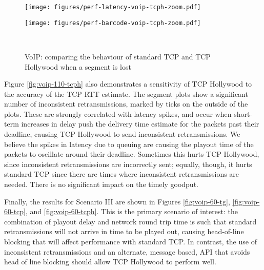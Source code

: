 \begin{figure*}[t!]
{{\begin{minipage}{91mm}
\texttt{[image: figures/perf-latency-voip-tcph-zoom.pdf]}\vspace{1mm}
\end{minipage}
\begin{minipage}{91mm}
\texttt{[image: figures/perf-barcode-voip-tcph-zoom.pdf]}\vspace{1mm}
\end{minipage}
\begin{minipage}{91mm}~\end{minipage}
}}
\caption{VoIP: comparing the behaviour of standard TCP and TCP Hollywood when a segment is lost}
\label{fig:voip-comparison}
\end{figure*}

Figure \ref{fig:voip-110-tcph} also demonstrates a sensitivity of TCP
Hollywood to the accuracy of the TCP RTT estimate. The segment plots
show a significant number of inconsistent retransmissions, marked by
ticks on the outside of the plots. These are strongly correlated with
latency spikes, and occur when short-term increases in delay push the
delivery time estimate for the packets past their deadline, causing
TCP Hollywood to send inconsistent retransmissions.
We believe the spikes in latency due to queuing are causing the playout
time of the packets to oscillate around their deadline. Sometimes this
hurts TCP Hollywood, since inconsistent retransmissions are incorrectly
sent; equally, though, it hurts standard TCP since there are times where
inconsistent retransmissions are needed.  There is no significant impact 
on the timely goodput.

Finally, the results for Scenario III are shown in Figures
\ref{fig:voip-60-tg}, \ref{fig:voip-60-tcp}, and \ref{fig:voip-60-tcph}.
This is the primary scenario of interest: the combination of playout delay
and network round trip time is such that standard retransmissions will not
arrive in time to be played out, causing head-of-line blocking that will
affect performance with standard TCP. In contrast, the use of inconsistent
retransmissions and an alternate, message based, API that avoids head of
line blocking should allow TCP Hollywood to perform well.


